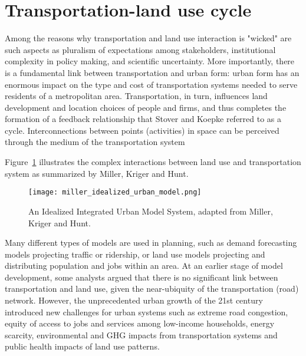 \section{Transportation-land use cycle} \label{sec:transportation_land_use_cycle}

Among the reasons why transportation and land use interaction is "wicked" are such aspects as pluralism of expectations among stakeholders, institutional complexity in policy making, and scientific uncertainty\cite{Noto2015}.
More importantly, there is a fundamental link between transportation and urban form: urban form has an enormous impact on the type and cost of transportation systems needed to serve residents of a metropolitan area\cite{Kelly1994}.
Transportation, in turn, influences land development and location choices of people and firms, and thus completes the formation of a feedback relationship that Stover and Koepke\cite{Stover1988} referred to as a cycle.
Interconnections between points (activities) in space can be perceived through the medium of the transportation system\cite{Miller1998}

Figure~\ref{fig:idealized_integrated_urban_model} illustrates the complex interactions between land use and transportation system as summarized by Miller, Kriger and Hunt\cite{Miller1998}.

\begin{figure}[hbt!]
    \centering
    \texttt{[image: miller\_idealized\_urban\_model.png]}
    \caption{An Idealized Integrated Urban Model System, adapted from Miller, Kriger and Hunt\cite{Miller1998}.}
    \label{fig:idealized_integrated_urban_model}
\end{figure}

Many different types of models are used in planning, such as demand forecasting models projecting traffic or ridership, or land use models projecting and distributing population and jobs within an area.
At an earlier stage of model development, some analysts argued that there is no significant link between transportation and land use, given the near-ubiquity of the transportation (road) network\cite{Miller1998}.
However, the unprecedented urban growth of the 21st century introduced new challenges for urban systems such as extreme road congestion, equity of access to jobs and services among low-income households, energy scarcity, environmental and GHG impacts from transportation systems and public health impacts of land use patterns\cite{Miller2018b,Moeckel2017}.

